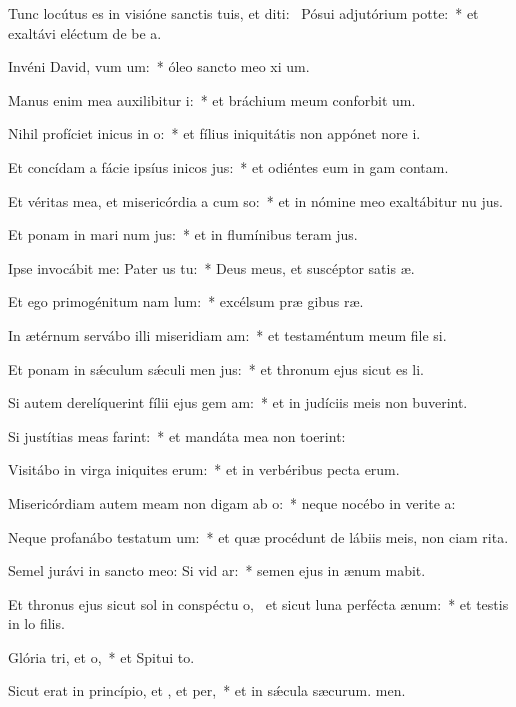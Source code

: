 \item Tunc locútus es in visióne sanctis tuis, et diti:~\pscross{} Pósui adjutórium  potte:~* et exaltávi eléctum de be a.
\item Invéni David, vum um:~* óleo sancto meo xi um.
\item Manus enim mea auxilibitur i:~* et bráchium meum conforbit um.
\item Nihil profíciet inicus in o:~* et fílius iniquitátis non appónet nore i.
\item Et concídam a fácie ipsíus inicos jus:~* et odiéntes eum in gam contam.
\item Et véritas mea, et misericórdia a cum so:~* et in nómine meo exaltábitur nu jus.
\item Et ponam in mari num jus:~* et in flumínibus teram jus.
\item Ipse invocábit me: Pater us  tu:~* Deus meus, et suscéptor satis æ.
\item Et ego primogénitum nam lum:~* excélsum præ gibus ræ.
\item In ætérnum servábo illi miseridiam am:~* et testaméntum meum file si.
\item Et ponam in sǽculum sǽculi men jus:~* et thronum ejus sicut es li.
\item Si autem derelíquerint fílii ejus gem am:~* et in judíciis meis non buverint.
\item Si justítias meas farint:~* et mandáta mea non toerint:
\item Visitábo in virga iniquites erum:~* et in verbéribus pecta erum.
\item Misericórdiam autem meam non digam ab o:~* neque nocébo in verite a:
\item Neque profanábo testatum um:~* et quæ procédunt de lábiis meis, non ciam rita.
\item Semel jurávi in sancto meo: Si vid ar:~* semen ejus in ænum mabit.
\item Et thronus ejus sicut sol in conspéctu o,~\pscross{} et sicut luna perfécta  ænum:~* et testis in lo filis.
\item Glória tri, et o,~* et Spitui to.
\item Sicut erat in princípio, et , et per,~* et in sǽcula sæcurum. men.
